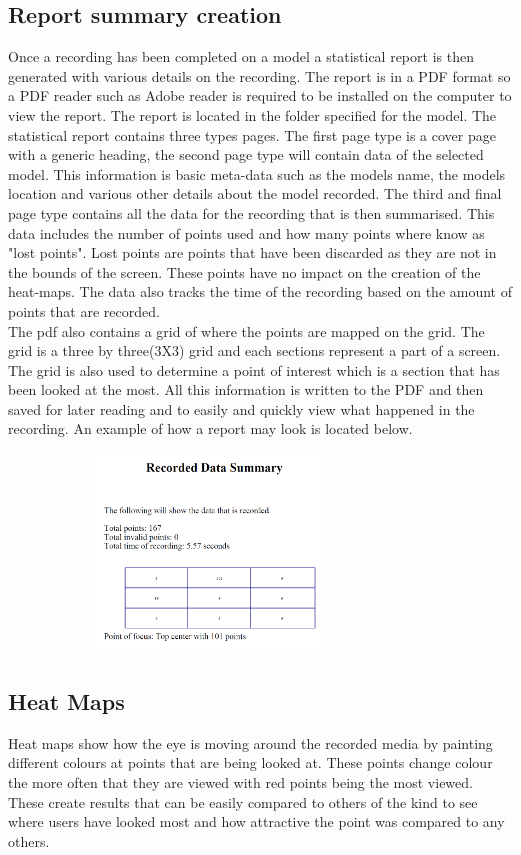 \subsection{Report summary creation}
Once a recording has been completed on a model a statistical report is then generated with various details on the recording. The report is in a PDF format so a PDF reader such as Adobe reader is required to be installed on the computer to view the report. The report is located in the folder specified for the model. The statistical report contains three types pages. The first page type is a cover page with a generic heading, the second page type will contain data of the selected model. This information is basic meta-data such as the models name, the models location and various other details about the model recorded. The third and final page type contains all the data for the recording that is then summarised. This data includes the number of points used and how many points where know as "lost points". Lost points are points that have been discarded as they are not in the bounds of the screen. These points have no impact on the creation of the heat-maps. The data also tracks the time of the recording based on the amount of points that are recorded.\\
The pdf also contains a grid of where the points are mapped on the grid. The grid is a three by three(3X3) grid and each sections represent a part of a screen. The grid is also used to determine a point of interest which is a section that has been looked at the most. All this information is written to the PDF and then saved for later reading and to easily and quickly view what happened in the recording. An example of how a report may look is located below.

\includegraphics[width=400px,height=200px]{./Images/reporting.PNG}

\subsection{Heat Maps}
Heat maps show how the eye is moving around the recorded media by painting different colours at points that are being looked at. These points change colour the more often that they are viewed with red points being the most viewed. These create results that can be easily compared to others of the kind to see where users have looked most and how attractive the point was compared to any others. 

